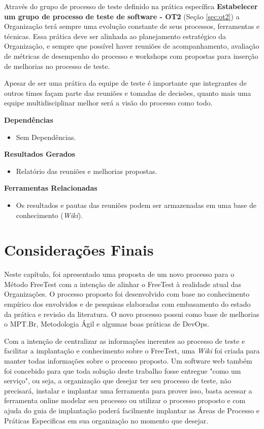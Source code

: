 Através do grupo de processo de teste definido na prática específica \textbf{Estabelecer um grupo de processo de teste de software - OT2} (Seção \ref{sec:ot2}) a Organização terá sempre uma evolução constante de seus processos, ferramentas e técnicas. Essa prática deve ser alinhada ao planejamento estratégico da Organização, e sempre que possível haver reuniões de acompanhamento, avaliação de métricas de desempenho do processo e workshops com propostas para inserção de melhorias no processo de teste.

Apesar de ser uma prática da equipe de teste é importante que integrantes de outros times façam parte das reuniões e tomadas de decisões, quanto mais uma equipe multidisciplinar melhor será a visão do processo como todo.

\textbf{Dependências}
\begin{itemize}
    \item Sem Dependências.
\end{itemize}

\textbf{Resultados Gerados}
\begin{itemize}
    \item Relatório das reuniões e melhorias propostas.
\end{itemize}

\textbf{Ferramentas Relacionadas}
\begin{itemize}
    \item Os resultados e pautas das reuniões podem ser armazenadas em uma base de conhecimento (\textit{Wiki}).
\end{itemize}


\section{Considerações Finais}
\label{sec:consideracoesfinaiscap4}

Neste capítulo, foi apresentado uma proposta de um novo processo para o Método FreeTest com a intenção de alinhar o FreeTest à realidade atual das Organizações. O processo proposto foi desenvolvido com base no conhecimento empírico dos envolvidos e de pesquisas elaboradas com embasamento do estado da prática e revisão da literatura. O novo processo possui como base de melhorias o MPT.Br, Metodologia Ágil e algumas boas práticas de DevOps. 

Com a intenção de centralizar as informações inerentes ao processo de teste e facilitar a implantação e conhecimento sobre o FreeTest, uma \textit{Wiki} foi criada para manter todas informações sobre o processo proposto. Um software web também foi concebido para que toda solução deste trabalho fosse entregue "como um serviço", ou seja, a organização que desejar ter seu processo de teste, não precisará, instalar e implantar uma ferramenta para prover isso, basta acessar a ferramenta online modelar seu processo ou utilizar o processo proposto e com ajuda do guia de implantação poderá facilmente implantar as Áreas de Processo e Práticas Especificas em sua organização no momento que desejar.


